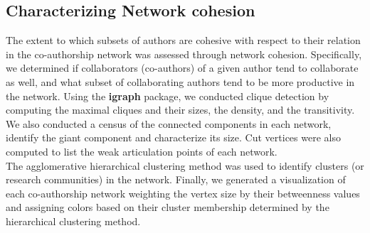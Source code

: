 \subsection{Characterizing Network cohesion}
The extent to which subsets of authors are cohesive with respect to their relation in the co-authorship network was assessed through network cohesion. Specifically, we determined if collaborators (co-authors) of a given author tend to collaborate as well, and what subset of collaborating authors tend to be more productive in the network. 
Using the \textbf{igraph} package, we conducted clique detection by computing the maximal cliques and their sizes, the density, and the transitivity. We also conducted a census of the connected components in each network, identify the giant component and characterize its size. Cut vertices were also computed to list the weak articulation points of each network. \\
The agglomerative hierarchical clustering method was used to identify clusters (or research communities) in the network. 
Finally, we generated a visualization of each co-authorship network weighting the vertex size by their betweenness values and assigning colors based on their cluster membership determined by the hierarchical clustering method.
%
